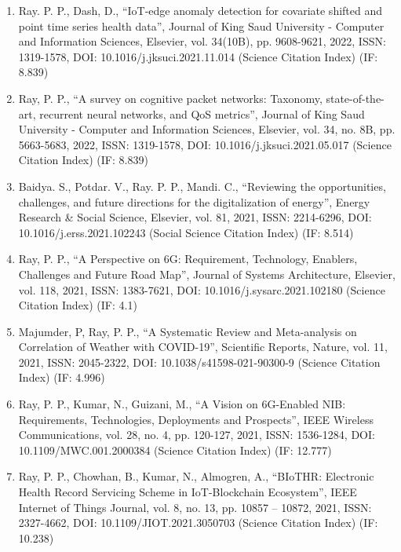 \documentclass[11pt,a4paper]{moderncv}
\begin{document}
\begin{adjustwidth}{6em}{0pt}
\begin{enumerate}
		\item Ray. P. P., Dash, D., “IoT-edge anomaly detection for covariate shifted and point time series health data”, Journal of King Saud University - Computer and Information Sciences, Elsevier, vol. 34(10B), pp. 9608-9621, 2022, ISSN: 1319-1578, DOI: 10.1016/j.jksuci.2021.11.014 (Science Citation Index) (IF: 8.839) 
		
		\item Ray, P. P., “A survey on cognitive packet networks: Taxonomy, state-of-the-art, recurrent neural networks, and QoS metrics”, Journal of King Saud University - Computer and Information Sciences, Elsevier, vol. 34, no. 8B, pp. 5663-5683, 2022, ISSN: 1319-1578, DOI: 10.1016/j.jksuci.2021.05.017 (Science Citation Index) (IF: 8.839) 
		
		\item Baidya. S., Potdar. V., Ray. P. P., Mandi. C., “Reviewing the opportunities, challenges, and future directions for the digitalization of energy”, Energy Research \& Social Science, Elsevier, vol. 81, 2021, ISSN: 2214-6296, DOI: 10.1016/j.erss.2021.102243 (Social Science Citation Index) (IF: 8.514) 
		
		\item Ray, P. P., “A Perspective on 6G: Requirement, Technology, Enablers, Challenges and Future Road Map”, Journal of Systems Architecture, Elsevier, vol. 118, 2021, ISSN: 1383-7621, DOI: 10.1016/j.sysarc.2021.102180 (Science Citation Index) (IF: 4.1)  
		
		\item Majumder, P, Ray, P. P., “A Systematic Review and Meta-analysis on Correlation of Weather with COVID-19”, Scientific Reports, Nature, vol. 11, 2021, ISSN: 2045-2322, DOI: 10.1038/s41598-021-90300-9 (Science Citation Index) (IF: 4.996) 
		
		\item Ray, P. P., Kumar, N., Guizani, M., “A Vision on 6G-Enabled NIB: Requirements, Technologies, Deployments and Prospects”, IEEE Wireless Communications, vol. 28, no. 4, pp. 120-127, 2021, ISSN: 1536-1284, DOI: 10.1109/MWC.001.2000384 (Science Citation Index) (IF: 12.777) 
		
		\item Ray, P. P., Chowhan, B., Kumar, N., Almogren, A., “BIoTHR: Electronic Health Record Servicing Scheme in IoT-Blockchain Ecosystem”, IEEE Internet of Things Journal, vol. 8, no. 13, pp. 10857 – 10872, 2021, ISSN: 2327-4662, DOI: 10.1109/JIOT.2021.3050703 (Science Citation Index) (IF: 10.238)
		

\end{enumerate}
\end{adjustwidth}
\end{document}
